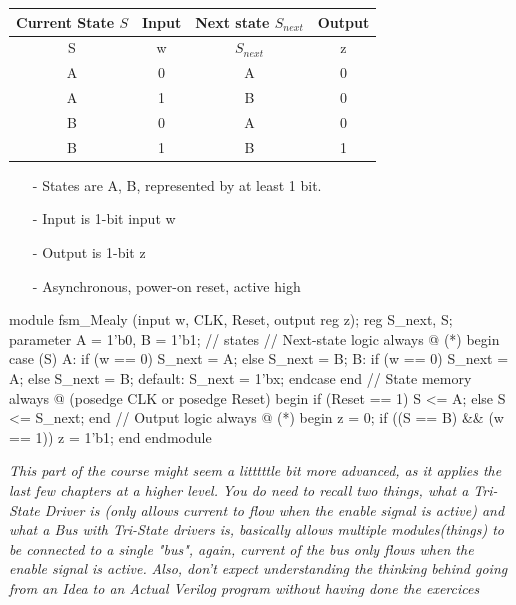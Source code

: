 \documentclass[12pt,openany]{book}
\begin{document}
\begin{minipage}[htp]{0.6\textwidth}
	\footnotesize
		\begin{center}
			\begin{tabular}[w]{|cc|c|c|}
				\hline
				Current State $S$ & Input & Next state $S_{next}$ & Output \\
				\hline
				S & w & $S_{next}$ & z \\
				\hline
				
				A & 0 & A & 0 \\
				A & 1 & B & 0 \\
				B & 0 & A & 0 \\
				B & 1 & B & 1 \\
				\hline
				\end{tabular}
		\end{center}

\end{minipage}
\hfill
\vline
\hfill
\begin{minipage}[htp]{0.35\textwidth}

\begin{center}
	\begin{justify}
			\begin{itemize}
				\item[-] States are A, B, represented by at least 1 bit.
				\item[-] Input is 1-bit input w
				\item[-] Output is 1-bit z
				\item[-] Asynchronous, power-on reset, active high 
			\end{itemize}
	\end{justify}
\end{center}
\end{minipage}
\vfill
\begin{vhdl}
module fsm_Mealy (input w, CLK, Reset, output reg z);
	reg S_next, S;
	parameter A = 1'b0, B = 1'b1; // states
	// Next-state logic
	always @ (*) begin
		case (S)
		A: if (w == 0) S_next = A;
			else S_next = B;
		B: if (w == 0) S_next = A;
			else S_next = B;
		default: S_next = 1'bx;
		endcase
	end
	// State memory
	always @ (posedge CLK or posedge Reset) begin
		if (Reset == 1) S <= A;
		else S <= S_next;
	end
	// Output logic
	always @ (*) begin
		z = 0;
		if ((S == B) && (w == 1)) z = 1'b1;
	end
endmodule
\end{vhdl}



\textit{This part of the course might seem a litttttle bit more advanced, as it applies the last few chapters at a higher level.} \newline 
\textit{You do need to recall two things, what a Tri-State Driver is (only allows current to flow when the enable signal is active) and what a Bus with Tri-State drivers is, basically allows multiple modules(things) to be connected to a single "bus", again, current of the bus only flows when the enable signal is active.}
\newline
\textit{Also, don't expect understanding the thinking behind going from an Idea to an Actual Verilog program without having done the exercices}
\end{document}
